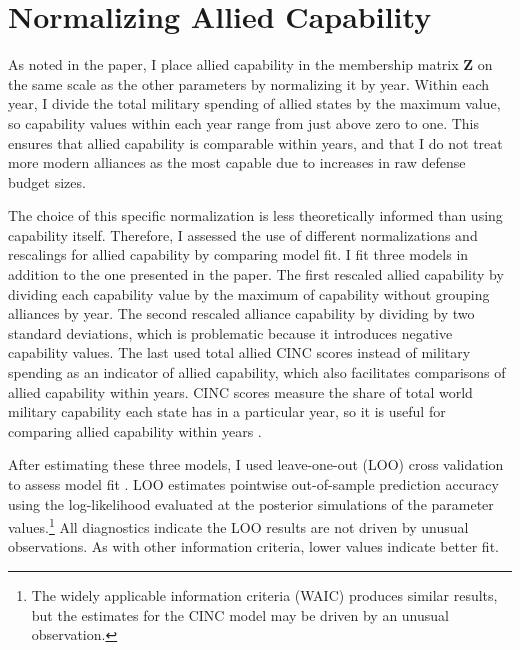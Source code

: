 \documentclass[12pt]{article}
\begin{document}
\section{Normalizing Allied Capability}

As noted in the paper, I place allied capability in the membership matrix \textbf{Z} on the same scale as the other parameters by normalizing it by year. 
Within each year, I divide the total military spending of allied states by the maximum value, so capability values within each year range from just above zero to one. 
This ensures that allied capability is comparable within years, and that I do not treat more modern alliances as the most capable due to increases in raw defense budget sizes. 


The choice of this specific normalization is less theoretically informed than using capability itself. 
Therefore, I assessed the use of different normalizations and rescalings for allied capability by comparing model fit. 
I fit three models in addition to the one presented in the paper. 
The first rescaled allied capability by dividing each capability value by the maximum of capability without grouping alliances by year. 
The second rescaled alliance capability by dividing by two standard deviations, which is problematic because it introduces negative capability values. 
The last used total allied CINC scores instead of military spending as an indicator of allied capability, which also facilitates comparisons of allied capability within years. 
CINC scores measure the share of total world military capability each state has in a particular year, so it is useful for comparing allied capability within years \citep{SingerCINC1988}. 


After estimating these three models, I used leave-one-out (LOO) cross validation to assess model fit \citep{Vehtarietal2017}. 
LOO estimates pointwise out-of-sample prediction accuracy using the log-likelihood evaluated at the posterior simulations of the parameter values.\footnote{The widely applicable information criteria (WAIC) produces similar results, but the estimates for the CINC model may be driven by an unusual observation.} 
All diagnostics indicate the LOO results are not driven by unusual observations. 
As with other information criteria, lower values indicate better fit. 

 
\end{document}
